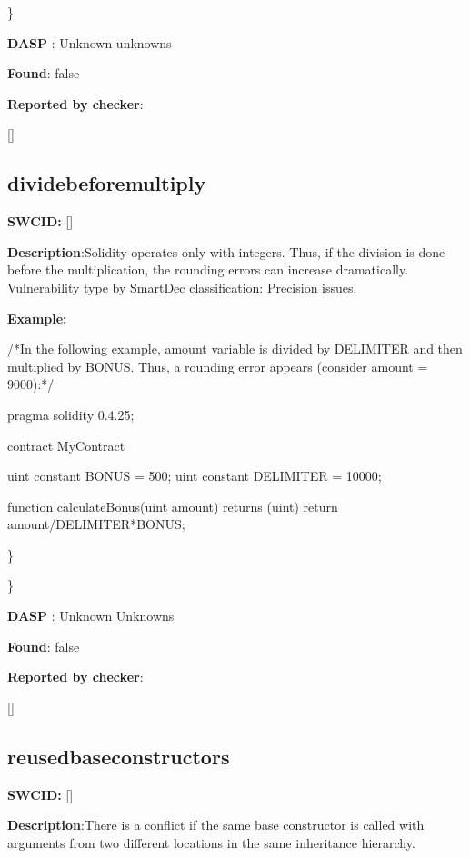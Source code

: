 \documentclass{article}
\begin{document}
\} 

\textbf{DASP} : Unknown unknowns

\textbf{Found}: false

\textbf{Reported by checker}: 
\begin{ffcode} 

[]
\end{ffcode} 
\subsection{divide{\textunderscore}before{\textunderscore}multiply} 
\textbf{SWC{\textunderscore}ID:} []

\textbf{Description}:Solidity operates only with integers. Thus, if the division is done before the multiplication, the rounding errors can increase dramatically. Vulnerability type by SmartDec classification: Precision issues.


\textbf{Example:} 
\begin{ffcode} 

/*In the following example, amount variable is divided by DELIMITER and then multiplied by BONUS. Thus, a rounding error appears (consider amount = 9000):*/ 

pragma solidity 0.4.25;

contract MyContract {

    uint constant BONUS = 500;
    uint constant DELIMITER = 10000;

    function calculateBonus(uint amount) returns (uint) {
        return amount/DELIMITER*BONUS;
    }
}

\end{ffcode} 
\} 

\} 

\textbf{DASP} : Unknown Unknowns

\textbf{Found}: false

\textbf{Reported by checker}: 
\begin{ffcode} 

[]
\end{ffcode} 
\subsection{reused{\textunderscore}base{\textunderscore}constructors} 
\textbf{SWC{\textunderscore}ID:} []

\textbf{Description}:There is a conflict if the same base constructor is called with arguments from two different locations in the same inheritance hierarchy.
\end{document}
